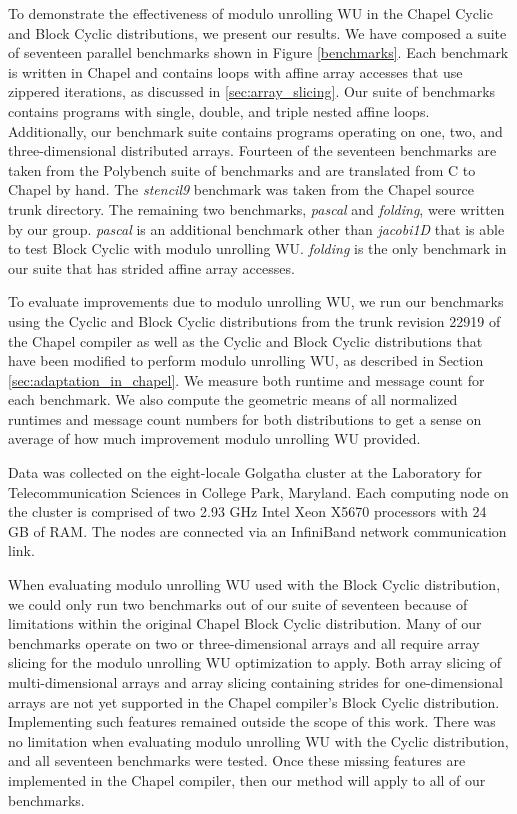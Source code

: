 To demonstrate the effectiveness of modulo unrolling WU in the Chapel Cyclic and Block Cyclic distributions, we present our results. We have composed a suite of seventeen parallel benchmarks shown in Figure \ref{benchmarks}. Each benchmark is written in Chapel and contains loops with affine array accesses that use zippered iterations, as discussed in \ref{sec:array_slicing}. Our suite of benchmarks contains programs with single, double, and triple nested affine loops. Additionally, our benchmark suite contains programs operating on one, two, and three-dimensional distributed arrays. Fourteen of the seventeen benchmarks are taken from the Polybench suite of benchmarks \cite{polybench} and are translated from C to Chapel by hand. The \textit{stencil9} benchmark was taken from the Chapel source trunk directory. The remaining two benchmarks, \textit{pascal} and \textit{folding}, were written by our group. \textit{pascal} is an additional benchmark other than \textit{jacobi1D} that is able to test Block Cyclic with modulo unrolling WU. \textit{folding} is the only benchmark in our suite that has strided affine array accesses. 

To evaluate improvements due to modulo unrolling WU, we run our benchmarks using the Cyclic and Block Cyclic distributions from the trunk revision 22919 of the Chapel compiler as well as the Cyclic and Block Cyclic distributions that have been modified to perform modulo unrolling WU, as described in Section \ref{sec:adaptation_in_chapel}. We measure both runtime and message count for each benchmark. We also compute the geometric means of all normalized runtimes and message count numbers for both distributions to get a sense on average of how much improvement modulo unrolling WU provided. 

Data was collected on the eight-locale Golgatha cluster at the Laboratory for Telecommunication Sciences in College Park, Maryland. Each computing node on the cluster is comprised of two 2.93 GHz Intel Xeon X5670 processors with 24 GB of RAM. The nodes are connected via an InfiniBand network communication link.

When evaluating modulo unrolling WU used with the Block Cyclic distribution, we could only run two benchmarks out of our suite of seventeen because of limitations within the original Chapel Block Cyclic distribution. Many of our benchmarks operate on two or three-dimensional arrays and all require array slicing for the modulo unrolling WU optimization to apply. Both array slicing of multi-dimensional arrays and array slicing containing strides for one-dimensional arrays are not yet supported in the Chapel compiler's Block Cyclic distribution. Implementing such features remained outside the scope of this work. There was no limitation when evaluating modulo unrolling WU with the Cyclic distribution, and all seventeen benchmarks were tested. Once these missing features are implemented in the Chapel compiler, then our method will apply to all of our benchmarks.


